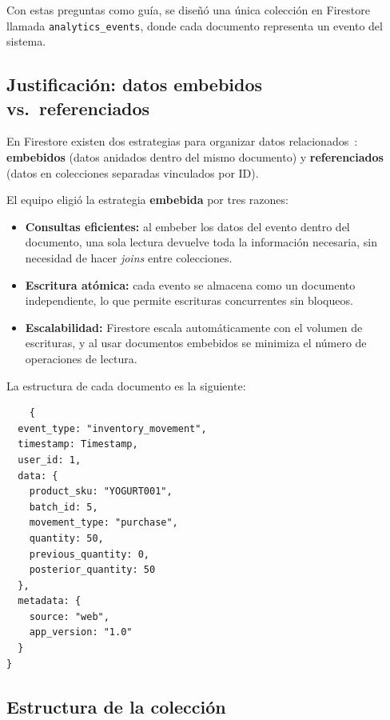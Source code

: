 \documentclass[journal]{IEEEtran}
\begin{document}
	Con estas preguntas como gu\'{i}a, se dise\~{n}\'{o} una
	\'{u}nica colecci\'{o}n en Firestore llamada
	\texttt{analytics\_events}, donde cada documento representa
	un evento del sistema.
	
	\subsection{Justificaci\'{o}n: datos embebidos vs.\ referenciados}
	\label{subsec:embebido-referenciado}
	
	En Firestore existen dos estrategias para organizar datos
	relacionados~\cite{Chodorow:2013}: \textbf{embebidos}
	(datos anidados dentro del mismo documento) y
	\textbf{referenciados} (datos en colecciones separadas
	vinculados por ID).
	
	El equipo eligi\'{o} la estrategia \textbf{embebida} por tres
	razones:
	
	\begin{itemize}[leftmargin=*, label=\textbullet, itemsep=2pt]
		\item \textbf{Consultas eficientes:} al embeber los datos del
		evento dentro del documento, una sola lectura devuelve
		toda la informaci\'{o}n necesaria, sin necesidad de
		hacer \textit{joins} entre colecciones.
		
		\item \textbf{Escritura at\'{o}mica:} cada evento se
		almacena como un documento independiente, lo que permite
		escrituras concurrentes sin bloqueos.
		
		\item \textbf{Escalabilidad:} Firestore escala
		autom\'{a}ticamente con el volumen de escrituras, y al
		usar documentos embebidos se minimiza el n\'{u}mero de
		operaciones de lectura.
	\end{itemize}
	
	La estructura de cada documento es la siguiente:
	
	\begin{verbatim}
	{
  event_type: "inventory_movement",
  timestamp: Timestamp,
  user_id: 1,
  data: {
    product_sku: "YOGURT001",
    batch_id: 5,
    movement_type: "purchase",
    quantity: 50,
    previous_quantity: 0,
    posterior_quantity: 50
  },
  metadata: {
    source: "web",
    app_version: "1.0"
  }
}
	\end{verbatim}
	
	\subsection{Estructura de la colecci\'{o}n}
	\label{subsec:coleccion}
	
\end{document}
